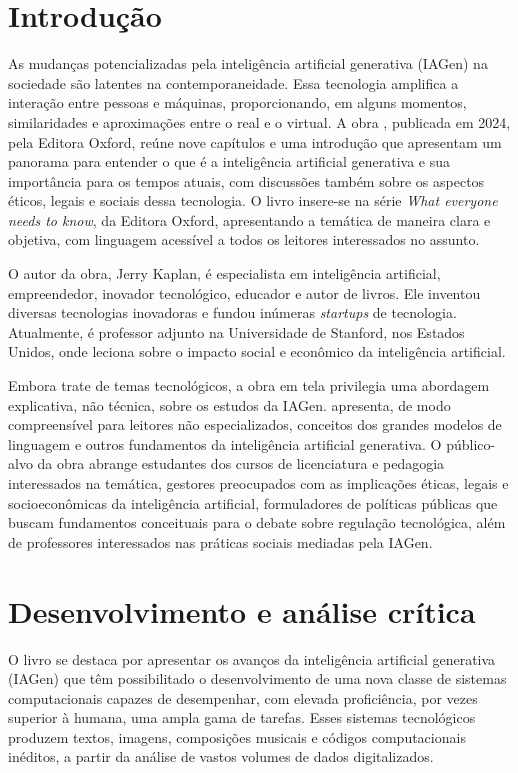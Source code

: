 \documentclass[portuguese]{textolivre}
\begin{document}
\section{Introdução}\label{sec-intro}
As mudanças potencializadas pela inteligência artificial generativa (IAGen) na sociedade são latentes na contemporaneidade. Essa tecnologia amplifica a interação entre pessoas e máquinas, proporcionando, em alguns momentos, similaridades e aproximações entre o real e o virtual. A obra , publicada em 2024, pela Editora Oxford, reúne nove capítulos e uma introdução que apresentam um panorama para entender o que é a inteligência artificial generativa e sua importância para os tempos atuais, com discussões também sobre os aspectos éticos, legais e sociais dessa tecnologia. O livro insere-se na série \textit{What everyone needs to know}, da Editora Oxford, apresentando a temática de maneira clara e objetiva, com linguagem acessível a todos os leitores interessados no assunto.

O autor da obra, Jerry Kaplan, é especialista em inteligência artificial, empreendedor, inovador tecnológico, educador e autor de livros. Ele inventou diversas tecnologias inovadoras e fundou inúmeras \textit{startups} de tecnologia. Atualmente, é professor adjunto na Universidade de Stanford, nos Estados Unidos, onde leciona sobre o impacto social e econômico da inteligência artificial.

Embora trate de temas tecnológicos, a obra em tela privilegia uma abordagem explicativa, não técnica, sobre os estudos da IAGen. \textcite{kaplan2024generative} apresenta, de modo compreensível para leitores não especializados, conceitos dos grandes modelos de linguagem e outros fundamentos da inteligência artificial generativa. O público-alvo da obra abrange estudantes dos cursos de licenciatura e pedagogia interessados na temática, gestores preocupados com as implicações éticas, legais e socioeconômicas da inteligência artificial, formuladores de políticas públicas que buscam fundamentos conceituais para o debate sobre regulação tecnológica, além de professores interessados nas práticas sociais mediadas pela IAGen.

\section{Desenvolvimento e análise crítica}\label{sec-normas}
O livro se destaca por apresentar os avanços da inteligência artificial generativa (IAGen) que têm possibilitado o desenvolvimento de uma nova classe de sistemas computacionais capazes de desempenhar, com elevada proficiência, por vezes superior à humana, uma ampla gama de tarefas. Esses sistemas tecnológicos produzem textos, imagens, composições musicais e códigos computacionais inéditos, a partir da análise de vastos volumes de dados digitalizados.
\end{document}
